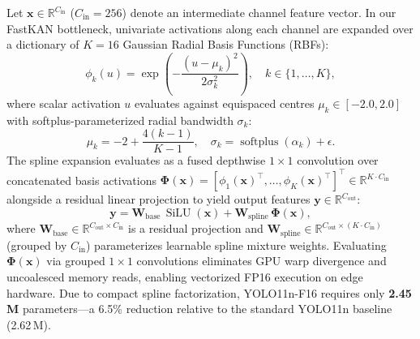 \documentclass[conference]{IEEEtran}
\begin{document}
Let $\mathbf{x} \in \mathbb{R}^{C_{\text{in}}}$ ($C_{\text{in}} = 256$) denote an intermediate channel feature vector. In our FastKAN bottleneck, univariate activations along each channel are expanded over a dictionary of $K=16$ Gaussian Radial Basis Functions (RBFs):
\begin{equation}
  \phi_k(u) = \exp\!\left(-\frac{(u - \mu_k)^2}{2\sigma_k^2}\right), \quad k \in \{1, \dots, K\},
  \label{eq:rbf_basis}
\end{equation}
where scalar activation $u$ evaluates against equispaced centres $\mu_k \in [-2.0, 2.0]$ with softplus-parameterized radial bandwidth $\sigma_k$:
\begin{equation}
  \mu_k = -2 + \frac{4(k - 1)}{K - 1}, \quad \sigma_k = \operatorname{softplus}(\alpha_k) + \epsilon.
  \label{eq:grid}
\end{equation}
The spline expansion evaluates as a fused depthwise $1 \times 1$ convolution over concatenated basis activations $\boldsymbol{\Phi}(\mathbf{x}) = [\phi_1(\mathbf{x})^\top, \dots, \phi_K(\mathbf{x})^\top]^\top \in \mathbb{R}^{K \cdot C_{\text{in}}}$ alongside a residual linear projection to yield output features $\mathbf{y} \in \mathbb{R}^{C_{\text{out}}}$:
\begin{equation}
  \mathbf{y} = \mathbf{W}_{\text{base}}\,\operatorname{SiLU}(\mathbf{x}) + \mathbf{W}_{\text{spline}}\,\boldsymbol{\Phi}(\mathbf{x}),
  \label{eq:fastkan_forward}
\end{equation}
where $\mathbf{W}_{\text{base}} \in \mathbb{R}^{C_{\text{out}} \times C_{\text{in}}}$ is a residual projection and $\mathbf{W}_{\text{spline}} \in \mathbb{R}^{C_{\text{out}} \times (K \cdot C_{\text{in}})}$ (grouped by $C_{\text{in}}$) parameterizes learnable spline mixture weights. Evaluating $\boldsymbol{\Phi}(\mathbf{x})$ via grouped $1 \times 1$ convolutions eliminates GPU warp divergence and uncoalesced memory reads, enabling vectorized FP16 execution on edge hardware. Due to compact spline factorization, YOLO11n-F16 requires only \textbf{2.45\,M} parameters---a 6.5\% reduction relative to the standard YOLO11n baseline (2.62\,M).
\end{document}
